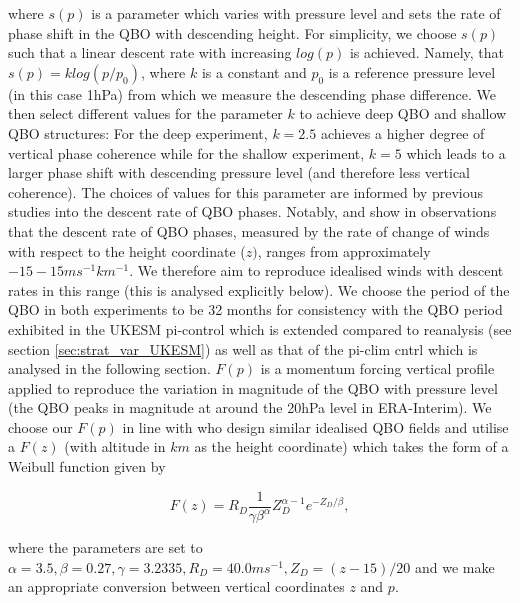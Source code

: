 \noindent where $s(p)$ is a parameter which varies with pressure level and sets the rate of phase shift in the QBO with descending height. For simplicity, we choose $s(p)$ such that a linear descent rate with increasing $log(p)$ is achieved. Namely, that $s(p) = k log(p/p_{0})$, where $k$ is a constant and $p_{0}$ is a reference pressure level (in this case 1hPa) from which we measure the descending phase difference. We then select different values for the parameter $k$ to achieve deep QBO and shallow QBO structures: For the deep experiment, $k = 2.5$ achieves a higher degree of vertical phase coherence while for the shallow experiment, $k = 5$ which leads to a larger phase shift with descending pressure level (and therefore less vertical coherence). The choices of values for this parameter are informed by previous studies into the descent rate of QBO phases. Notably, \cite{kinnersleyDescent1996} and \cite{coySeasonal2020} show in observations that the descent rate of QBO phases, measured by the rate of change of winds with respect to the height coordinate ($z)$, ranges from approximately $-15-15ms^{-1}km^{-1}$. We therefore aim to reproduce idealised winds with descent rates in this range (this is analysed explicitly below). We choose the period of the QBO in both experiments to be 32 months for consistency with the QBO period exhibited in the UKESM pi-control which is extended compared to reanalysis (see section \ref{sec:strat_var_UKESM}) as well as that of the pi-clim cntrl which is analysed in the following section. $F(p)$ is a momentum forcing vertical profile applied to reproduce the variation in magnitude of the QBO with pressure level (the QBO peaks in magnitude at around the 20hPa level in ERA-Interim). We choose our $F(p)$ in line with \cite{pascoeQuasibiennial2005b} who design similar idealised QBO fields and utilise a $F(z)$ (with altitude in $km$ as the height coordinate) which takes the form of a Weibull function given by

\begin{equation} \label{eq:vertical_profile}
F(z) = R_D \frac{1}{\gamma \beta^\alpha}  Z_D^{\alpha-1}  e^{-Z_D/\beta},
\end{equation}

\noindent where the parameters are set to $\alpha = 3.5, \beta = 0.27, \gamma = 3.2335, R_D = 40.0 ms^{-1}, Z_{D} = (z - 15)/20$ and we make an appropriate conversion between vertical coordinates $z$ and $p$.

